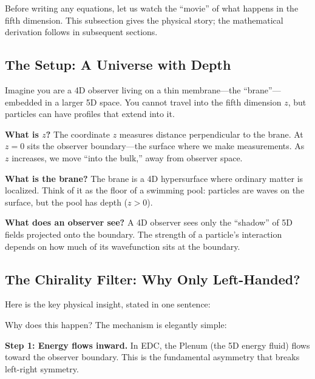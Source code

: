 \medskip
Before writing any equations, let us watch the ``movie'' of what happens in the
fifth dimension. This subsection gives the physical story; the mathematical
derivation follows in subsequent sections.


\subsection{The Setup: A Universe with Depth}

Imagine you are a 4D observer living on a thin membrane---the ``brane''---embedded
in a larger 5D space. You cannot travel into the fifth dimension $z$, but particles
can have profiles that extend into it.

\textbf{What is $z$?} The coordinate $z$ measures distance perpendicular to the
brane. At $z = 0$ sits the observer boundary---the surface where we make measurements.
As $z$ increases, we move ``into the bulk,'' away from observer space.

\textbf{What is the brane?} The brane is a 4D hypersurface where ordinary matter
is localized. Think of it as the floor of a swimming pool: particles are waves
on the surface, but the pool has depth ($z > 0$).

\textbf{What does an observer see?} A 4D observer sees only the ``shadow'' of
5D fields projected onto the boundary. The strength of a particle's interaction
depends on how much of its wavefunction sits at the boundary.


\subsection{The Chirality Filter: Why Only Left-Handed?}

Here is the key physical insight, stated in one sentence:

\begin{center}
\end{center}

Why does this happen? The mechanism is elegantly simple:

\textbf{Step 1: Energy flows inward.} In EDC, the Plenum (the 5D energy fluid)
flows toward the observer boundary. This is the fundamental asymmetry that
breaks left-right symmetry.


